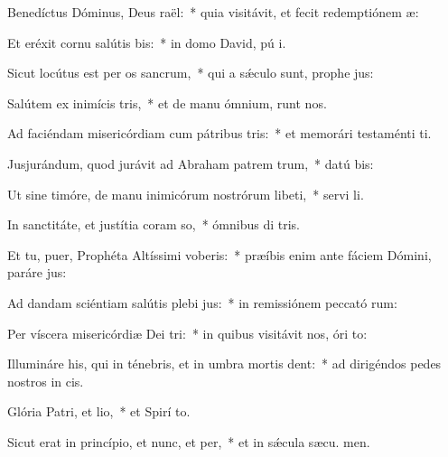 \item Benedíctus Dóminus, Deus raël:~* quia visitávit, et fecit redemptiónem  æ:
\item Et eréxit cornu salútis bis:~* in domo David, pú i.
\item Sicut locútus est per os sancrum,~* qui a sǽculo sunt, prophe jus:
\item Salútem ex inimícis tris,~* et de manu ómnium,  runt nos.
\item Ad faciéndam misericórdiam cum pátribus tris:~* et memorári testaménti  ti.
\item Jusjurándum, quod jurávit ad Abraham patrem trum,~* datú  bis:
\item Ut sine timóre, de manu inimicórum nostrórum libeti,~* servi li.
\item In sanctitáte, et justítia coram so,~* ómnibus di tris.
\item Et tu, puer, Prophéta Altíssimi voberis:~* præíbis enim ante fáciem Dómini, paráre  jus:
\item Ad dandam sciéntiam salútis plebi jus:~* in remissiónem peccató rum:
\item Per víscera misericórdiæ Dei tri:~* in quibus visitávit nos, óri  to:
\item Illumináre his, qui in ténebris, et in umbra mortis dent:~* ad dirigéndos pedes nostros in  cis.
\item Glória Patri, et lio,~* et Spirí to.
\item Sicut erat in princípio, et nunc, et per,~* et in sǽcula sæcu. men.
